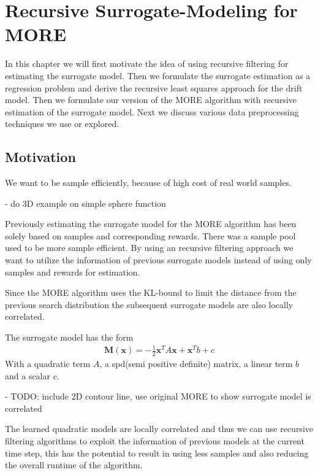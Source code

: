 
\chapter{Recursive Surrogate-Modeling for MORE}
In this chapter we will first motivate the idea of using recursive filtering
for estimating the surrogate model. Then we formulate the surrogate estimation
as a regression problem and derive the recursive
least squares approach for the drift model.
Then we formulate our version of the MORE algorithm with
recursive estimation of the surrogate model.
Next we discuss various data preprocessing techniques we use or explored.

\section{Motivation}
We want to be sample efficiently, because of high cost of real world samples.

- do 3D example on simple sphere function

Previously estimating the surrogate model for the MORE algorithm has been solely based
on samples and corresponding rewards. There was a sample pool used to be more
sample efficient. By using an recursive filtering approach
we want to utilize the information of previous surrogate models instead
of using only samples and rewards for estimation.

Since the MORE algorithm uses the KL-bound to limit the distance from the previous search
distribution the subsequent surrogate models are also locally correlated.

The surrogate model has the form
\begin{align}
  \label{surrogate}
  \mathbf{M}(\mathbf{x}) = -\frac{1}{2} \mathbf{x}^T A \mathbf{x}
  + \mathbf{x}^T b + c 
\end{align}
With a quadratic term $A$, a spd(semi positive definite) matrix, a
linear term $b$ and a scalar $c$.

- TODO: include 2D contour line, use original MORE to show surrogate
  model is correlated

The learned quadratic models are locally correlated and thus we can use recursive
filtering algorithms to exploit the information of previous models at
the current time step, this has the potential to result in using less samples
and also reducing the overall runtime of the algorithm.

